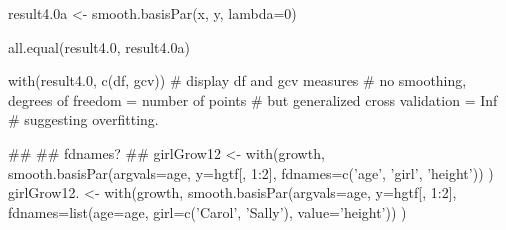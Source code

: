\begin{Examples}
\begin{ExampleCode}
result4.0a <- smooth.basisPar(x, y, lambda=0)

all.equal(result4.0, result4.0a)


with(result4.0, c(df, gcv)) #  display df and gcv measures
# no smoothing, degrees of freedom = number of points 
# but generalized cross validation = Inf
# suggesting overfitting.  

##
## fdnames?
##
girlGrow12 <- with(growth, smooth.basisPar(argvals=age, y=hgtf[, 1:2],
              fdnames=c('age', 'girl', 'height')) ) 
girlGrow12. <- with(growth, smooth.basisPar(argvals=age, y=hgtf[, 1:2],
    fdnames=list(age=age, girl=c('Carol', 'Sally'), value='height')) )

\end{ExampleCode}
\end{Examples}

